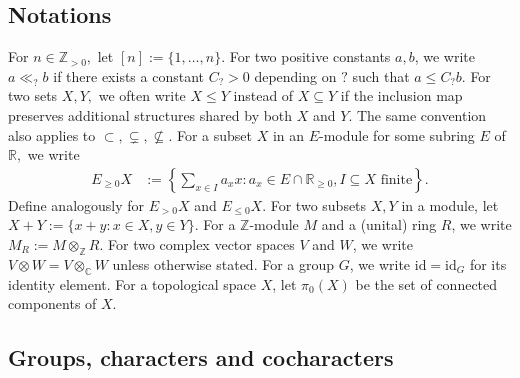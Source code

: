\documentclass[10pt]{amsart}
\theoremstyle{definition}
\numberwithin{equation}{section}
\numberwithin{equation}{subsection}
\newcommand{\ZZ}{\mathbb{Z}}
\newcommand{\RR}{\mathbb{R}}
\newcommand{\CC}{\mathbb{C}}
\begin{document}
\subsection{Notations} For $n\in \ZZ_{>0},$ let $[n]:=\{1,\ldots, n\}$. For two positive constants $a,b$, we write $a\ll_{?} b$ if there exists a constant $C_{?}>0$ depending on $?$ such that $a\leq C_{?}b$. For two sets $X,Y,$ we often write $X\le Y$ instead of $X\subseteq Y$ if the inclusion map preserves additional structures shared by both $X$ and $Y$. The same convention also applies to $\subset, \subsetneq, \not\subseteq$. For a subset $X$ in an $E$-module for some subring $E$ of $\RR,$ we write
\begin{align*}
    E_{\geq 0}X&:=\left\{\sum_{x\in I}a_xx: a_x\in E\cap \RR_{\geq 0},I\subseteq X \textrm{ finite}\right\}.
\end{align*}
Define analogously for $E_{>0}X$ and $E_{\le 0} X$.
For two subsets $X,Y$ in a module, let $X+Y:=\{x+y: x\in X, y\in Y\}.$ For a $\ZZ$-module $M$ and a (unital) ring $R$, we write $M_R := M\otimes_\ZZ R$. For two complex vector spaces $V$ and $W$, we write $V\otimes W = V\otimes_\CC W$ unless otherwise stated. For a group $G$, we write $\mathrm{id}=\mathrm{id}_G$ for its identity element. For a topological space $X$, let $\pi_0(X)$ be the set of connected components of $X$.

\subsection{Groups, characters and cocharacters}\label{ssec:characters}
\end{document}
